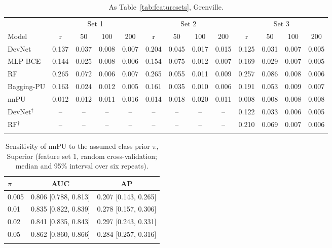 \documentclass[pdflatex,sn-apa]{sn-jnl}
\begin{document}
\begin{appendices}
\begin{table}[!h]
\caption{As Table~\ref{tab:featuresets}, Grenville.}\label{tab:featuresets-gren}
\scriptsize
\setlength{\tabcolsep}{1.5pt}
\begin{tabular*}{\textwidth}{@{\extracolsep\fill}lcccccccccccc}
\toprule
 & \multicolumn{4}{c}{Set 1} & \multicolumn{4}{c}{Set 2} & \multicolumn{4}{c}{Set 3} \\
\cmidrule(lr){2-5}\cmidrule(lr){6-9}\cmidrule(lr){10-13}
Model & r & 50 & 100 & 200 & r & 50 & 100 & 200 & r & 50 & 100 & 200 \\
\midrule
DevNet & 0.137 & 0.037 & 0.008 & 0.007 & 0.204 & 0.045 & 0.017 & 0.015 & 0.125 & 0.031 & 0.007 & 0.005 \\
MLP-BCE & 0.144 & 0.025 & 0.008 & 0.006 & 0.154 & 0.075 & 0.012 & 0.007 & 0.169 & 0.029 & 0.007 & 0.005 \\
RF & 0.265 & 0.072 & 0.006 & 0.007 & 0.265 & 0.055 & 0.011 & 0.009 & 0.257 & 0.086 & 0.008 & 0.006 \\
Bagging-PU & 0.163 & 0.024 & 0.012 & 0.005 & 0.161 & 0.035 & 0.010 & 0.006 & 0.191 & 0.053 & 0.009 & 0.007 \\
nnPU & 0.012 & 0.012 & 0.011 & 0.016 & 0.014 & 0.018 & 0.020 & 0.011 & 0.008 & 0.008 & 0.008 & 0.008 \\
DevNet$^\dagger$ & -- & -- & -- & -- & -- & -- & -- & -- & 0.122 & 0.033 & 0.006 & 0.005 \\
RF$^\dagger$ & -- & -- & -- & -- & -- & -- & -- & -- & 0.210 & 0.069 & 0.007 & 0.006 \\
\botrule
\end{tabular*}
\end{table}

\begin{table}[!h]
\caption{Sensitivity of nnPU to the assumed class prior $\pi$, Superior (feature set 1, random cross-validation; median and 95\% interval over six repeats).}\label{tab:prior}
\footnotesize
\begin{tabular*}{0.6\textwidth}{@{\extracolsep\fill}lcc}
\toprule
$\pi$ & AUC & AP \\
\midrule
0.005 & 0.806 [0.788, 0.813] & 0.207 [0.143, 0.265] \\
0.01 & 0.835 [0.822, 0.839] & 0.278 [0.157, 0.306] \\
0.02 & 0.841 [0.835, 0.843] & 0.297 [0.243, 0.331] \\
0.05 & 0.862 [0.860, 0.866] & 0.284 [0.257, 0.316] \\
\botrule
\end{tabular*}
\end{table}


\end{appendices}
\end{document}

